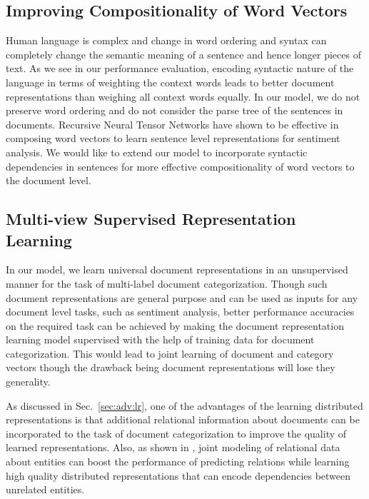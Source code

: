 \subsection{Improving Compositionality of Word Vectors}
Human language is complex and change in word ordering and syntax can completely change the semantic meaning of a sentence and hence longer pieces of text. 
As we see in our performance evaluation, encoding syntactic nature of the language in terms of weighting the context words leads to better document representations than weighing all context words equally. 
In our model, we do not preserve word ordering and do not consider the parse tree of the sentences in documents. 
Recursive Neural Tensor Networks \citep{socher2013recursive} have shown to be effective in composing word vectors to learn sentence level representations for sentiment analysis. 
We would like to extend our model to incorporate syntactic dependencies in sentences for more effective compositionality of word vectors to the document level.

\subsection{Multi-view Supervised Representation Learning}
In our model, we learn universal document representations in an unsupervised manner for the task of multi-label document categorization. 
Though such document representations are general purpose and can be used as inputs for any document level tasks, such as sentiment analysis, better performance accuracies on the required task can be achieved by making the document representation learning model supervised with the help of training data for document categorization. This would lead to joint learning of document and category vectors though the drawback being document representations will lose they generality.

As discussed in Sec.~\ref{sec:adv:lr}, one of the advantages of the learning distributed representations is that additional relational information about documents can be incorporated to the task of document categorization to improve the quality of learned representations. Also, as shown in \cite{gupta2015collectively}, joint modeling of relational data about entities can boost the performance of predicting relations while learning high quality distributed representations that can encode dependencies between unrelated entities. 
